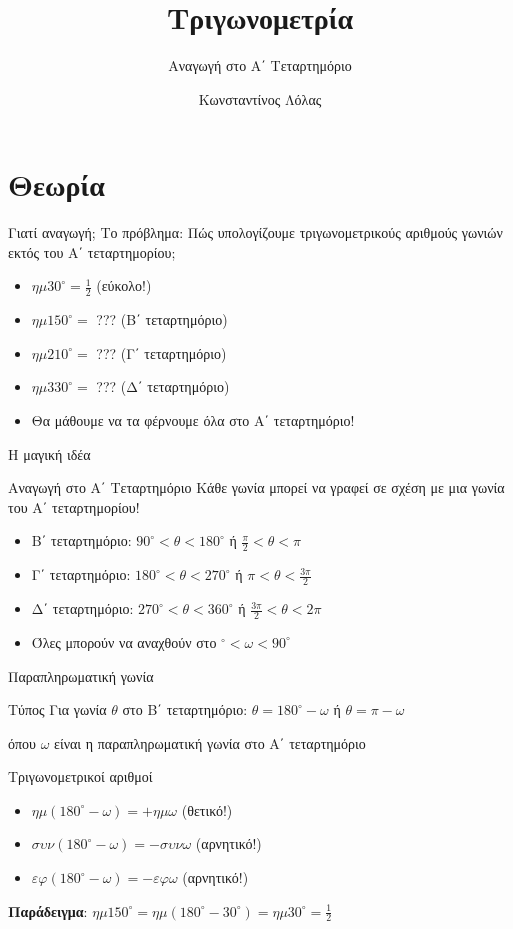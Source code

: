 \documentclass{presentation}
\title{Τριγωνομετρία}
\subtitle{Αναγωγή στο Α΄ Τεταρτημόριο}
\author[Λόλας]{Κωνσταντίνος Λόλας }
\begin{document}
\begin{frame}
  \titlepage
\end{frame}

\section{Θεωρία}

\begin{frame}{Γιατί αναγωγή;}
  Το πρόβλημα: Πώς υπολογίζουμε τριγωνομετρικούς αριθμούς γωνιών εκτός του Α΄ τεταρτημορίου;
  \begin{itemize}[<+->]
    \item $ημ30^{\circ}=\frac{1}{2}$ (εύκολο!)
    \item $ημ150^{\circ}=$ ??? (Β΄ τεταρτημόριο)
    \item $ημ210^{\circ}=$ ??? (Γ΄ τεταρτημόριο)
    \item $ημ330^{\circ}=$ ??? (Δ΄ τεταρτημόριο)
    \item Θα μάθουμε να τα φέρνουμε όλα στο Α΄ τεταρτημόριο!
  \end{itemize}
\end{frame}

\begin{frame}{Η μαγική ιδέα}
  \begin{block}{Αναγωγή στο Α΄ Τεταρτημόριο}
    Κάθε γωνία μπορεί να γραφεί σε σχέση με μια γωνία του Α΄ τεταρτημορίου!
  \end{block}
  \pause

  \begin{itemize}[<+->]
    \item Β΄ τεταρτημόριο: $90^{\circ}<θ<180^{\circ}$ ή $\frac{π}{2}<θ<π$
    \item Γ΄ τεταρτημόριο: $180^{\circ}<θ<270^{\circ}$ ή $π<θ<\frac{3π}{2}$
    \item Δ΄ τεταρτημόριο: $270^{\circ}<θ<360^{\circ}$ ή $\frac{3π}{2}<θ<2π$
    \item Όλες μπορούν να αναχθούν στο $^{\circ}<ω<90^{\circ}$
  \end{itemize}
\end{frame}

\begin{frame}{Παραπληρωματική γωνία}
  \begin{block}{Τύπος}
    Για γωνία $θ$ στο Β΄ τεταρτημόριο: $θ=180^{\circ}-ω$ ή $θ=π-ω$

    όπου $ω$ είναι η παραπληρωματική γωνία στο Α΄ τεταρτημόριο
  \end{block}
  \pause

  \begin{exampleblock}{Τριγωνομετρικοί αριθμοί}
    \begin{itemize}[<+->]
      \item $ημ(180^{\circ}-ω)=+ημω$ (θετικό!)
      \item $συν(180^{\circ}-ω)=-συνω$ (αρνητικό!)
      \item $εφ(180^{\circ}-ω)=-εφω$ (αρνητικό!)
    \end{itemize}
  \end{exampleblock}
  \pause

  \textbf{Παράδειγμα}: $ημ150^{\circ}=ημ(180^{\circ}-30^{\circ})=ημ30^{\circ}=\frac{1}{2}$
\end{frame}
\end{document}
